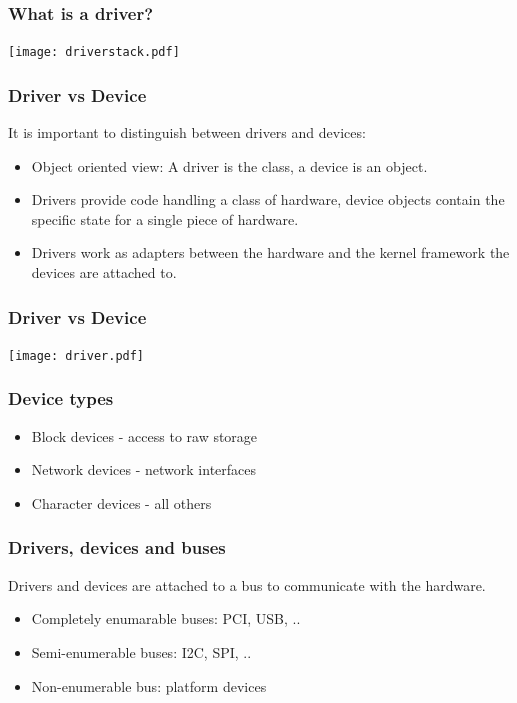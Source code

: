 \documentclass{beamer}
\begin{document}
\begin{frame}
\frametitle{What is a driver?}
\begin{center}
\texttt{[image: driverstack.pdf]}
\end{center}
\end{frame}

\begin{frame}
\frametitle{Driver vs Device}
It is important to distinguish between drivers and devices:
\begin{itemize}
	\item Object oriented view: A driver is the class, a device is an object.
	\item Drivers provide code handling a class of hardware, device objects contain the specific state for a single piece of hardware.
	\item Drivers work as adapters between the hardware and the kernel framework the devices are attached to.
\end{itemize}
\end{frame}

\begin{frame}
\frametitle{Driver vs Device}
\begin{center}
\texttt{[image: driver.pdf]}
\end{center}
\end{frame}

\begin{frame}
\frametitle{Device types}
\begin{itemize}
	\item Block devices - access to raw storage
	\item Network devices - network interfaces
	\item Character devices - all others
\end{itemize}


\end{frame}

\begin{frame}
\frametitle{Drivers, devices and buses}
Drivers and devices are attached to a bus to communicate with the hardware.
\begin{itemize}
	\item Completely enumarable buses: PCI, USB, ..
	\item Semi-enumerable buses: I2C, SPI, ..
	\item Non-enumerable bus: platform devices
\end{itemize}
\end{frame}
\end{document}
